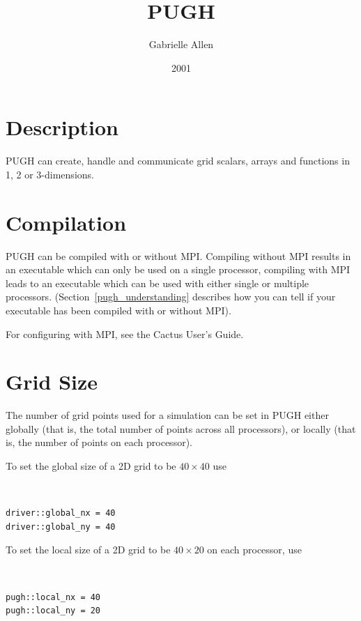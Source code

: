 \documentclass{article}
\begin{document}
\title{PUGH}
\author{Gabrielle Allen}
\date{2001}
\maketitle


\section{Description}

PUGH can create, handle and communicate grid scalars, arrays and functions
in 1, 2 or 3-dimensions.

\section{Compilation}

PUGH can be compiled with or without MPI. Compiling without MPI results
in an executable which can only be used on a single processor, compiling 
with MPI leads to an executable which can be used with either single or
multiple processors.
(Section~\ref{pugh_understanding} describes how you can tell if your
executable has been compiled with or without MPI).

For configuring with MPI, see the Cactus User's Guide.

\section{Grid Size}

The number of grid points used for a simulation can be set in PUGH either
globally (that is, the total number of points across all processors), or 
locally (that is, the number of points on each processor). 

To set the global size of a 2D grid to be $40\times 40$ use

{\tt
\begin{verbatim}
driver::global_nx = 40
driver::global_ny = 40
\end{verbatim}
}

To set the local size of a 2D grid to be $40\times 20$ on each processor, use

{\tt
\begin{verbatim}
pugh::local_nx = 40
pugh::local_ny = 20
\end{verbatim}
}
\end{document}
